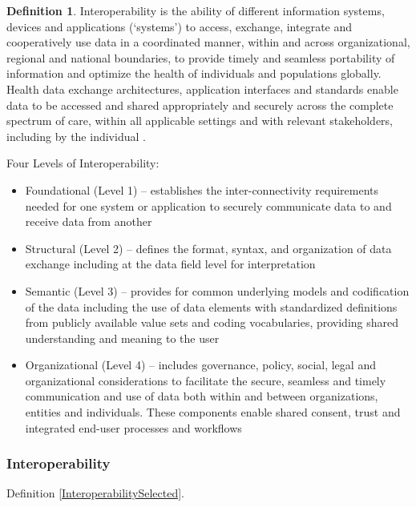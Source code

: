 \documentclass[letterpaper, cleveref]{lipics-v2019}
\theoremstyle{definition}
\newtheorem{defn}{Definition}
\begin{document}
\begin{defn}
  Interoperability is the ability of different information systems, devices and
  applications (‘systems’) to access, exchange, integrate and cooperatively use
  data in a coordinated manner, within and across organizational, regional and
  national boundaries, to provide timely and seamless portability of information
  and optimize the health of individuals and populations globally. Health data
  exchange architectures, application interfaces and standards enable data to be
  accessed and shared appropriately and securely across the complete spectrum of
  care, within all applicable settings and with relevant stakeholders, including
  by the individual \citep{HIMSS2019}.
	
  Four Levels of Interoperability:
  \begin{itemize}
  \item Foundational (Level 1) – establishes the inter-connectivity requirements
    needed for one system or application to securely communicate data to and
    receive data from another
		
  \item Structural (Level 2) – defines the format, syntax, and organization of
    data exchange including at the data field level for interpretation
		
  \item Semantic (Level 3) – provides for common underlying models and
    codification of the data including the use of data elements with
    standardized definitions from publicly available value sets and coding
    vocabularies, providing shared understanding and meaning to the user
		
  \item Organizational (Level 4) – includes governance, policy, social, legal
    and organizational considerations to facilitate the secure, seamless and
    timely communication and use of data both within and between organizations,
    entities and individuals. These components enable shared consent, trust and
    integrated end-user processes and workflows
  \end{itemize}
\end{defn}

\begin{mybox}
\subsubsection*{Interoperability}
Definition \ref{InteroperabilitySelected}.
\end{mybox}
\end{document}
